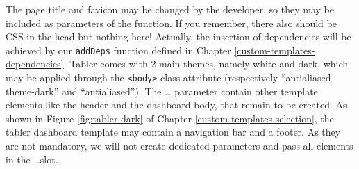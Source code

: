 \documentclass[
]{book}
\begin{document}
The page title and favicon may be changed by the developer, so they may be included as parameters of the function. If you remember, there also should be CSS in the head but nothing here! Actually, the insertion of dependencies will be achieved by our \texttt{addDeps} function defined in Chapter \ref{custom-templates-dependencies}. Tabler comes with 2 main themes, namely white and dark, which may be applied through the \texttt{\textless{}body\textgreater{}} class attribute (respectively ``antialiased theme-dark'' and ``antialiased''). The \ldots{} parameter contain other template elements like the header and the dashboard body, that remain to be created. As shown in Figure \ref{fig:tabler-dark} of Chapter \ref{custom-templates-selection}, the tabler dashboard template may contain a navigation bar and a footer. As they are not mandatory, we will not create dedicated parameters and pass all elements in the \ldots slot.
\end{document}
